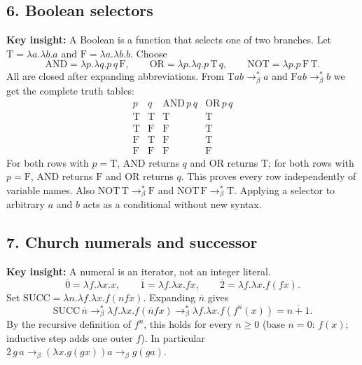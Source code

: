 \documentclass[11pt]{article}
\newcommand{\insight}[1]{\par\medskip\noindent\textbf{Key insight:} #1}
\begin{document}
\subsection*{6. Boolean selectors}
\insight{A Boolean is a function that selects one of two branches.}
Let $\mathrm{T}=\lambda a.\lambda b.a$ and $\mathrm{F}=\lambda a.\lambda b.b$. Choose
\[\mathrm{AND}=\lambda p.\lambda q.p\,q\,\mathrm{F},\qquad
  \mathrm{OR}=\lambda p.\lambda q.p\,\mathrm{T}\,q,\qquad
  \mathrm{NOT}=\lambda p.p\,\mathrm{F}\,\mathrm{T}.\]
All are closed after expanding abbreviations. From $\mathrm{T}ab\to_\beta^*a$ and $\mathrm{F}ab\to_\beta^*b$ we get the complete truth tables:
\[\begin{array}{c|c|c|c}
 p&q&\mathrm{AND}\,p\,q&\mathrm{OR}\,p\,q\\\hline
 \mathrm{T}&\mathrm{T}&\mathrm{T}&\mathrm{T}\\
 \mathrm{T}&\mathrm{F}&\mathrm{F}&\mathrm{T}\\
 \mathrm{F}&\mathrm{T}&\mathrm{F}&\mathrm{T}\\
 \mathrm{F}&\mathrm{F}&\mathrm{F}&\mathrm{F}
\end{array}\]
For both rows with $p=\mathrm{T}$, AND returns $q$ and OR returns $\mathrm{T}$; for both rows with $p=\mathrm{F}$, AND returns $\mathrm{F}$ and OR returns $q$. This proves every row independently of variable names. Also $\mathrm{NOT}\,\mathrm{T}\to_\beta^*\mathrm{F}$ and $\mathrm{NOT}\,\mathrm{F}\to_\beta^*\mathrm{T}$. Applying a selector to arbitrary $a$ and $b$ acts as a conditional without new syntax.

\subsection*{7. Church numerals and successor}
\insight{A numeral is an iterator, not an integer literal.}
\[\overline0=\lambda f.\lambda x.x,\qquad
  \overline1=\lambda f.\lambda x.fx,\qquad
  \overline2=\lambda f.\lambda x.f(fx).\]
Set $\mathrm{SUCC}=\lambda n.\lambda f.\lambda x.f(nfx)$. Expanding $\overline n$ gives
\[\mathrm{SUCC}\,\overline n\to_\beta^*\lambda f.\lambda x.f(\overline n f x)
\to_\beta^*\lambda f.\lambda x.f(f^n(x))=\overline{n+1}.\]
By the recursive definition of $f^n$, this holds for every $n\ge0$ (base $n=0$: $f(x)$; inductive step adds one outer $f$). In particular $\overline2\,g\,a\to_\beta(\lambda x.g(gx))a\to_\beta g(ga)$.
\end{document}
